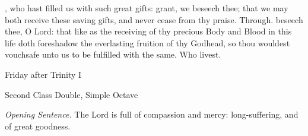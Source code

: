 
\postcommunion
{}, who hast filled us with such great gifts: grant, we beseech thee; that we may both receive these saving gifts, and never cease from thy praise. Through.
 beseech thee, O Lord: that like as the receiving of thy precious Body and Blood in this life doth foreshadow the everlasting fruition of thy Godhead, so thou wouldest vouchsafe unto us to be fulfilled with the same. Who livest.

\begin{inhead}
	{Friday after Trinity I}\par
    {Second Class Double, Simple Octave}
\end{inhead}
\par\noindent
\textit{Opening Sentence.} The Lord is full of compassion and mercy: long-suffering, and of great goodness.



